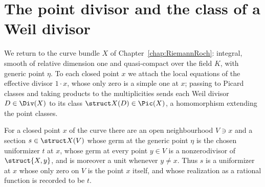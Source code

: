 \section{The point divisor and the class of a Weil divisor}

We return to the curve bundle \(X\) of Chapter~\ref{chap:RiemannRoch}: integral, smooth of relative
dimension one and quasi-compact over the field \(K\), with generic point \(\eta\). To each closed
point \(x\) we attach the local equations of the effective divisor \(1 \cdot x\), whose only zero
is a simple one at \(x\); passing to Picard classes and taking products to the multiplicities sends
each Weil divisor \(D \in \Div(X)\) to its class \(\struct X(D) \in \Pic(X)\), a homomorphism
extending the point classes.

\begin{lemma}
  \label{lem:exists_pointLocalEquation}
  \leanok
  For a closed point \(x\) of the curve there are an open neighbourhood \(V \ni x\) and a section
  \(s \in \struct X(V)\) whose germ at the generic point \(\eta\) is the chosen uniformizer \(t\) at
  \(x\), whose germ at every point \(y \in V\) is a nonzerodivisor of \(\struct{X,y}\), and is
  moreover a unit whenever \(y \neq x\). Thus \(s\) is a uniformizer at \(x\) whose only zero on
  \(V\) is the point \(x\) itself, and whose realization as a rational function is recorded to be
  \(t\).
\end{lemma}
